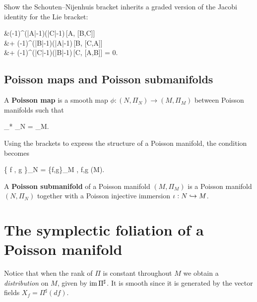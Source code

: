 \documentclass[main.tex]{subfiles}
\begin{document}
\begin{exercise}
\label{ex:graded_jacobi}
	Show the Schouten--Nijenhuis bracket inherits a graded version of the Jacobi identity for the Lie bracket:
	\begin{eqalign}
		&(-1)^{(|A|-1)(|C|-1)}\,[A, [B,C]]\\
			&\qquad \qquad + (-1)^{(|B|-1)(|A|-1)}\,[B, [C,A]]\\
				&\qquad \qquad \qquad \qquad + (-1)^{(|C|-1)(|B|-1)}\,[C, [A,B]] = 0.
	\end{eqalign}
\end{exercise}

\subsection{Poisson maps and Poisson submanifolds}
\begin{definition}
	A \textbf{Poisson map} is a smooth map $\phi : (N, \Pi_N) \to (M, \Pi_M)$ between Poisson manifolds such that
	\begin{eqalign}
	\label{eq:poisson_map_condition}
		\phi_* \Pi_N = \Pi_M.
	\end{eqalign}
\end{definition}

Using the brackets to express the structure of a Poisson manifold, the condition becomes
\begin{eqalign}
	\{ f \circ \phi, g \circ \phi \}_N = \{f,g\}_M \circ \phi, \quad \forall f,g \in \Cinfty(M).
\end{eqalign}

\begin{definition}
	A \textbf{Poisson submanifold} of a Poisson manifold $(M, \Pi_M)$ is a Poisson manifold $(N, \Pi_N)$ together with a Poisson injective immersion $\iota: N \hookrightarrow M$.
\end{definition}

\section{The symplectic foliation of a Poisson manifold}
Notice that when the rank of $\Pi$ is constant throughout $M$ we obtain a \emph{distribution} on $M$, given by $\operatorname{im} \Pi^\sharp$. It is smooth since it is generated by the vector fields $X_f = \Pi^\sharp (df)$.
\end{document}
